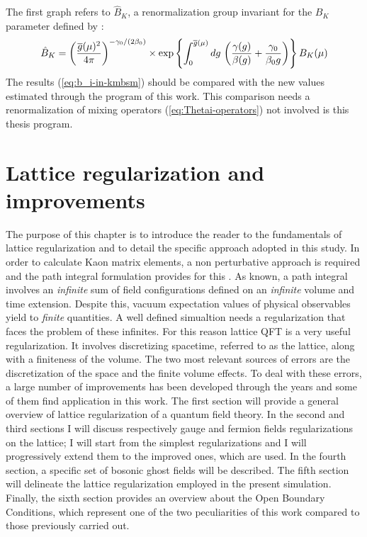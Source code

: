 \documentclass[english, LaM, oneside, noexaminfo]{sapthesis}
\newcommand{\obc}{Open Boundary Conditions}
\begin{document}
\newline
The first graph refers to $\hat B_K$, a renormalization group invariant for the $B_K$ parameter defined by \cite{FLAG}:
\begin{equation*}
    \hat B_K = \left(\frac{\overline{g}(\mu)^2}{4 \pi}\right)^{-\gamma_0/(2\beta_0)}\times \text{exp}\left\{ \int_0^{\overline{g}(\mu)} dg \hspace*{.5mm} \left( \frac{\gamma (g)}{\beta (g)} + \frac{\gamma_0}{\beta_0 g}\right) \right\} B_K (\mu)
\end{equation*}
\newline
The results (\ref{eq:b_i-in-kmbsm}) should be compared with the new values estimated through the program of this work.
This comparison needs a renormalization of mixing operators (\ref{eq:Thetai-operators}) not involved is this thesis program.

\chapter{Lattice regularization and improvements}\label{ch:lattice-regularization}
\lettrine[lines=2, findent=3pt, nindent=0pt]{T}{}he purpose of this chapter is to introduce the reader to the fundamentals of lattice regularization and to detail the specific approach adopted in this study.
\newline
In order to calculate Kaon matrix elements, a non perturbative approach is required and the path integral formulation provides for this \cite{Itzykson-Zuber}.
As known, a path integral involves an \textit{infinite} sum of field configurations defined on an \textit{infinite} volume and time extension.
Despite this, vacuum expectation values of physical observables yield to \textit{finite} quantities.
A well defined simualtion needs a regularization that faces the problem of these infinites.
For this reason lattice QFT is a very useful regularization.
It involves discretizing spacetime, referred to as the lattice, along with a finiteness of the volume.
The two most relevant sources of errors are the discretization of the space and the finite volume effects.
To deal with these errors, a large number of improvements has been developed through the years and some of them find application in this work.
\newline
The first section will provide a general overview of lattice regularization of a quantum field theory.
In the second and third sections I will discuss respectively gauge and fermion fields regularizations on the lattice;
I will start from the simplest regularizations and I will progressively extend them to the improved ones, which are used.
In the fourth section, a specific set of bosonic ghost fields will be described.
The fifth section will delineate the lattice regularization employed in the present simulation.
Finally, the sixth section provides an overview about the \obc, which represent one of the two peculiarities of this work compared to those previously carried out.
\end{document}
